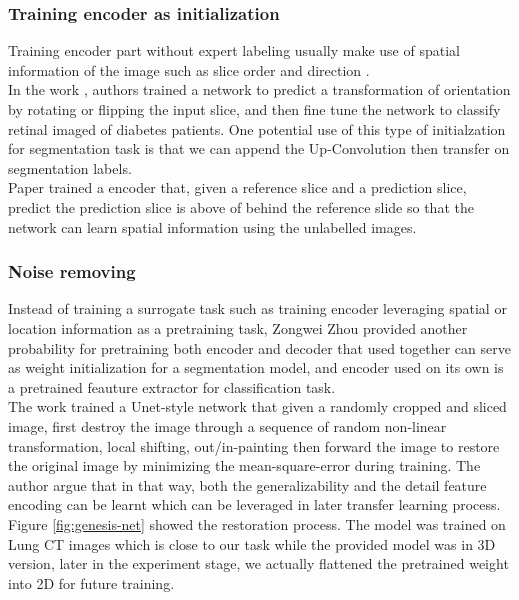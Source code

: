 \subsubsection{Training encoder as initialization}
Training encoder part without expert labeling usually make use of spatial information of the image such as slice order \cite{aaaaa} and direction \cite{bbbbb}. \\

In the work \cite{bbb}, authors trained a network to predict a transformation of orientation by rotating or flipping the input slice, and then fine tune the network to classify retinal imaged of diabetes patients. One potential use of this type of initialzation for segmentation task is that we can append the Up-Convolution then transfer on segmentation labels.\\

Paper \cite{aaa} trained a encoder that, given a reference slice and a prediction slice, predict the prediction slice is above of behind the reference slide so that the network can learn spatial information using the unlabelled images.\\

\subsubsection{Noise removing}
Instead of training a surrogate task such as training encoder leveraging spatial or location information as a pretraining task, Zongwei Zhou \cite{zhou_models_2019} provided another probability for pretraining both encoder and decoder that used together can serve as weight initialization for a segmentation model, and encoder used on its own is a pretrained feauture extractor for classification task.\\

The work trained a Unet-style network that given a randomly cropped and sliced image, first destroy the image through a sequence of random non-linear transformation, local shifting, out/in-painting then forward the image to restore the original image by minimizing the mean-square-error during training. The author argue that in that way, both the generalizability and the detail feature encoding can be learnt which can be leveraged in later transfer learning process. Figure \ref{fig:genesis-net} showed the restoration process. The model was trained on Lung CT images which is close to our task while the provided model was in 3D version, later in the experiment stage, we actually flattened the pretrained weight into 2D for future training.

